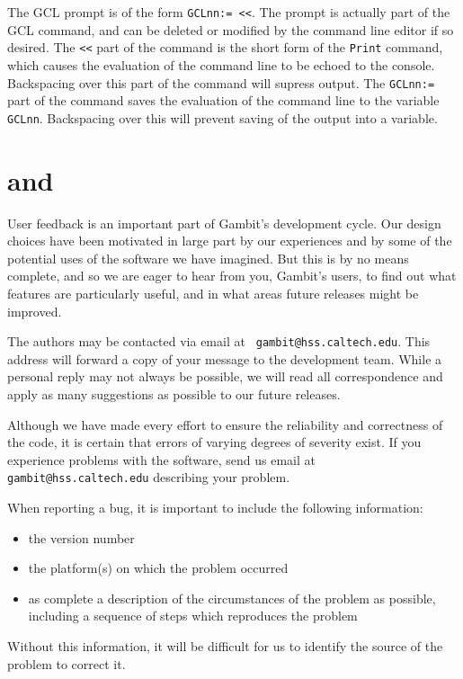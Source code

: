 The GCL prompt is of the form \verb+GCLnn:= <<+.  The prompt is
actually part of the GCL command, and can be deleted or modified by
the command line editor if so desired.  The \verb+<<+ part of the
command is the short form of the \verb+Print+ command, which causes
the evaluation of the command line to be echoed to the
console. Backspacing over this part of the command will supress
output.  The \verb+GCLnn:=+ part of the command saves the evaluation
of the command line to the variable \verb+GCLnn+.  Backspacing over
this will prevent saving of the output into a variable.

\section{ and }

User feedback is an important part of Gambit's development cycle.  Our
design choices have been motivated in large part by our experiences
and by some of the potential uses of the software we have imagined.
But this is by no means complete, and so we are eager to hear from
you, Gambit's users, to find out what features are particularly
useful, and in what areas future releases might be improved.

The authors may be contacted via email at {\tt
gambit@hss.caltech.edu}.  This address will forward a copy of your
message to the development team.  While a personal reply may not
always be possible, we will read all correspondence and apply as many
suggestions as possible to our future releases.

Although we have made every effort to ensure the reliability and
correctness of the code, it is certain that errors of varying degrees
of severity exist.   If you experience problems with the software,
send us email at {\tt gambit@hss.caltech.edu} describing your problem.

When reporting a bug, it is important to include the following
information:

\begin{itemize}
\item the version number
\item the platform(s) on which the problem occurred
\item as complete a description of the circumstances of the problem as
possible, including a sequence of steps which reproduces the problem
\end{itemize}
 
\noindent 
Without this information, it will be difficult for us to
identify the source of the problem to correct it.

